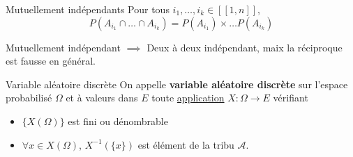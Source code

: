 
\begin{Definition}[colbacktitle=red!75!black]{Mutuellement indépendants}{}
  Pour tous $i_1, \dots, i_k \in [\![1, n]\!]$, 
  \begin{equation}
    P( A _{i_1} \cap \dots \cap A _{i_k}) = P(A _{i_1}) \times \dots P(A _{i _k})
  \end{equation}
\end{Definition}

\begin{Prop}{}{}
Mutuellement indépendant $\implies$ Deux à deux indépendant, maix la réciproque est fausse en général.
\end{Prop}




























\begin{Definition}[colbacktitle=red!75!black]{Variable aléatoire discrète}{}
On appelle \textbf{variable aléatoire discrète} sur l'espace probabilisé $\Omega$ et à valeurs dans $E$ toute \underline{application} $X : \Omega \to E$ vérifiant 
\begin{itemize}

  \item $\{X(\Omega)\}$ est fini ou dénombrable 
  \item $\forall x \in X(\Omega)$, $X ^{-1}(\{x\})$ est élément de la tribu $\mathcal{A}$.

\end{itemize}

\end{Definition}

